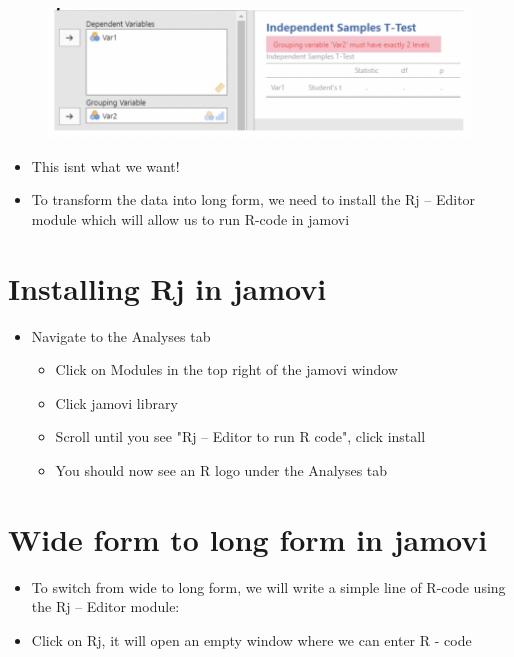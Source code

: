 \documentclass[
  letterpaper,
  DIV=11,
  numbers=noendperiod]{scrreprt}
\begin{document}
\begin{figure}

{\centering \includegraphics{images/mod1_22.png}

}

\end{figure}

\begin{itemize}
\item
  This isn\textquotesingle t what we want!
\item
  To transform the data into long form, we need to install the Rj --
  Editor module which will allow us to run R-code in jamovi
\end{itemize}

\hypertarget{installing-rj-in-jamovi}{%
\section{Installing Rj in jamovi}\label{installing-rj-in-jamovi}}

\begin{itemize}
\item
  Navigate to the Analyses tab

  \begin{itemize}
  \item
    Click on Modules in the top right of the jamovi window
  \item
    Click jamovi library
  \item
    Scroll until you see "Rj -- Editor to run R code", click install
  \item
    You should now see an R logo under the Analyses tab
  \end{itemize}
\end{itemize}

\hypertarget{wide-form-to-long-form-in-jamovi}{%
\section{Wide form to long form in
jamovi}\label{wide-form-to-long-form-in-jamovi}}

\begin{itemize}
\item
  To switch from wide to long form, we will write a simple line of
  R-code using the Rj -- Editor module:~
\item
  Click on Rj, it will open an empty window where we can enter R - code
\end{itemize}
\end{document}
